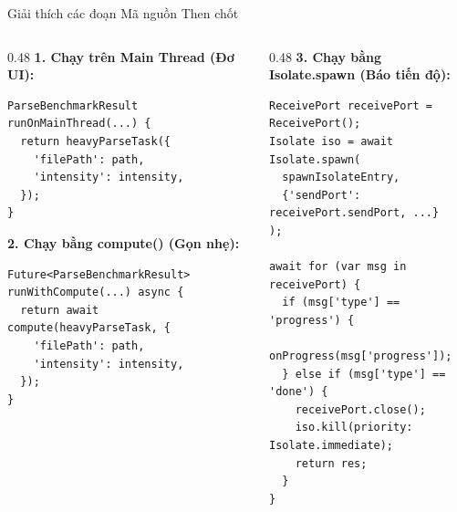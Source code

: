 \documentclass[aspectratio=169, 10pt]{beamer}
\begin{document}
\begin{frame}[fragile]{Giải thích các đoạn Mã nguồn Then chốt}
  \begin{columns}[t]
    \begin{column}{0.48\textwidth}
      \textbf{1. Chạy trên Main Thread (Đơ UI):}
\begin{lstlisting}
ParseBenchmarkResult runOnMainThread(...) {
  return heavyParseTask({
    'filePath': path,
    'intensity': intensity,
  });
}
\end{lstlisting}
      \vspace{0.1cm}
      \textbf{2. Chạy bằng compute() (Gọn nhẹ):}
\begin{lstlisting}
Future<ParseBenchmarkResult> runWithCompute(...) async {
  return await compute(heavyParseTask, {
    'filePath': path,
    'intensity': intensity,
  });
}
\end{lstlisting}
    \end{column}

    \begin{column}{0.48\textwidth}
      \textbf{3. Chạy bằng Isolate.spawn (Báo tiến độ):}
\begin{lstlisting}
ReceivePort receivePort = ReceivePort();
Isolate iso = await Isolate.spawn(
  spawnIsolateEntry, 
  {'sendPort': receivePort.sendPort, ...}
);

await for (var msg in receivePort) {
  if (msg['type'] == 'progress') {
    onProgress(msg['progress']);
  } else if (msg['type'] == 'done') {
    receivePort.close();
    iso.kill(priority: Isolate.immediate);
    return res;
  }
}
\end{lstlisting}
    \end{column}
  \end{columns}
\end{frame}
\end{document}
